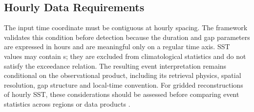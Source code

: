 \subsection{Hourly Data Requirements}

The input time coordinate must be contiguous at hourly spacing. The framework validates this condition before detection because the duration and gap parameters are expressed in hours and are meaningful only on a regular time axis. SST values may contain s; they are excluded from climatological statistics and do not satisfy the exceedance relation. The resulting event interpretation remains conditional on the observational product, including its retrieval physics, spatial resolution, gap structure and local-time convention. For gridded reconstructions of hourly SST, these considerations should be assessed before comparing event statistics across regions or data products \citep{Marullo2014}.
